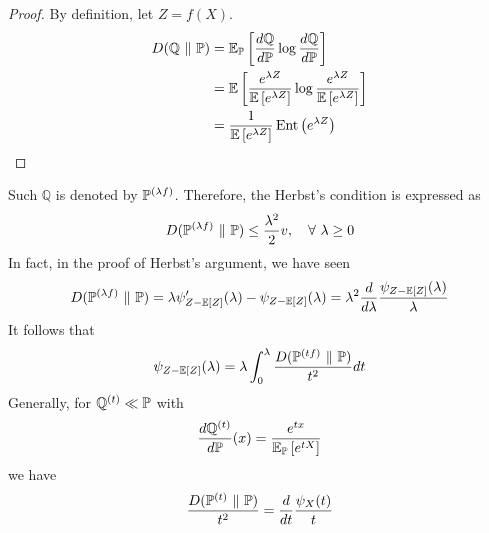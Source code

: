 \begin{enumerate}[label=\arabic{*}.]
	\begin{proof}
	    By definition, let $Z = f(X)$.
	    \begin{equation*}
	    	\begin{aligned}
	    		D(\mathbb{Q} ~\Vert~ \mathbb{P}) &=  \mathbb{E}_{\mathbb{P}}\left[\frac{d\mathbb{Q}}{d\mathbb{P}}\log \frac{d\mathbb{Q}}{d\mathbb{P}}\right] \\
	    		&=  \mathbb{E}\left[\frac{e^{\lambda Z}}{\mathbb{E}\left[e^{\lambda Z}\right]}\log \frac{e^{\lambda Z}}{\mathbb{E}\left[e^{\lambda Z}\right]}\right] \\
	    		&= \frac{1}{\mathbb{E}\left[e^{\lambda Z}\right]} \operatorname{Ent}\left(e^{\lambda Z}\right) \quad\qedhere
	    	\end{aligned}
	    \end{equation*}
	\end{proof}
	\begin{rmk}
	    Such $\mathbb{Q}$ is denoted by $\mathbb{P}^{(\lambda f)}$. Therefore, the  Herbst's condition is expressed as
	    \begin{equation*}
	    	D(\mathbb{P}^{(\lambda f)} ~\Vert~ \mathbb{P}) \leq \frac{\lambda^2}{2}v,\quad \forall~\lambda \geq 0
	    \end{equation*}
	    In fact, in the proof of Herbst's argument, we have seen
	    \begin{equation*}
	    	D(\mathbb{P}^{(\lambda f)} ~\Vert~ \mathbb{P}) = \lambda \psi^\prime_{Z-\mathbb{E}[Z]}(\lambda) - \psi_{Z-\mathbb{E}[Z]}(\lambda) = \lambda^2 \frac{d}{d\lambda} \frac{\psi_{Z-\mathbb{E}[Z]}(\lambda)}{\lambda}
	    \end{equation*}
	    It follows that
	    \begin{equation*}
	    	\psi_{Z-\mathbb{E}[Z]}(\lambda) = \lambda\int_0^\lambda \frac{D(\mathbb{P}^{(t f)} ~\Vert~ \mathbb{P})}{t^2}dt
	    \end{equation*}
	    Generally, for $\mathbb{Q}^{(t)} \ll \mathbb{P}$ with
	    \begin{equation*}
	        \frac{d\mathbb{Q}^{(t)}}{d\mathbb{P}}(x) = \frac{e^{tx}}{\mathbb{E}_{\mathbb{P}}\left[e^{tX}\right]}
	    \end{equation*}
	    we have
	    \begin{equation*}
	        \frac{D(\mathbb{P}^{(t)} ~\Vert~ \mathbb{P})}{t^2} = \frac{d}{dt}\frac{\psi_X(t)}{t}
	    \end{equation*}
	\end{rmk}


\end{enumerate}
